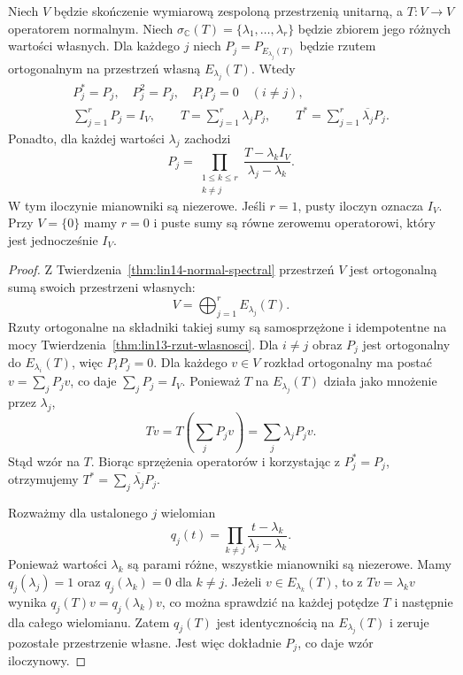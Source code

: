 \begin{twierdzenie}
\label{thm:lin14-spectral-projections}
Niech \(V\) będzie skończenie
wymiarową zespoloną przestrzenią
unitarną, a \(T\colon V\to V\)
operatorem normalnym.
Niech
\(\sigma_{\mathbb C}(T)=
 \{\lambda_1,\ldots,\lambda_r\}\)
będzie zbiorem jego różnych wartości własnych.
Dla każdego \(j\) niech
\(P_j=P_{E_{\lambda_j}(T)}\)
będzie rzutem ortogonalnym na
przestrzeń własną \(E_{\lambda_j}(T)\).
Wtedy
\[
 \begin{gathered}
 P_j^*=P_j,\quad P_j^2=P_j,\quad
 P_iP_j=0\quad(i\ne j),\\
 \sum_{j=1}^{r}P_j=I_V,\qquad
 T=\sum_{j=1}^{r}\lambda_jP_j,\qquad
 T^*=\sum_{j=1}^{r}
            \overline{\lambda_j}P_j.
 \end{gathered}
\]
Ponadto, dla każdej wartości
\(\lambda_j\) zachodzi
\[
 P_j=
 \prod_{\substack{1\le k\le r\\ k\ne j}}
 \frac{T-\lambda_k I_V}
      {\lambda_j-\lambda_k}.
\]
W tym iloczynie mianowniki
są niezerowe. Jeśli \(r=1\),
pusty iloczyn oznacza \(I_V\).
Przy \(V=\{0\}\) mamy \(r=0\)
i puste sumy są równe
zerowemu operatorowi, który
jest jednocześnie \(I_V\).
\end{twierdzenie}
\begin{proof}
Z
Twierdzenia~\ref{thm:lin14-normal-spectral}
przestrzeń \(V\) jest ortogonalną
sumą swoich przestrzeni własnych:
\[
 V=\bigoplus_{j=1}^{r}E_{\lambda_j}(T).
\]
Rzuty ortogonalne na składniki
takiej sumy są samosprzężone
i idempotentne na mocy
Twierdzenia~\ref{thm:lin13-rzut-wlasnosci}.
Dla \(i\ne j\) obraz \(P_j\)
jest ortogonalny do \(E_{\lambda_i}(T)\),
więc \(P_iP_j=0\).
Dla każdego \(v\in V\)
rozkład ortogonalny ma postać
\(v=\sum_jP_jv\), co daje
\(\sum_jP_j=I_V\).
Ponieważ \(T\) na \(E_{\lambda_j}(T)\)
działa jako mnożenie przez \(\lambda_j\),
\[
 Tv=T\!\left(\sum_jP_jv\right)
   =\sum_j\lambda_jP_jv.
\]
Stąd wzór na \(T\).
Biorąc sprzężenia operatorów
i korzystając z \(P_j^*=P_j\),
otrzymujemy
\(T^*=\sum_j\overline{\lambda_j}P_j\).

Rozważmy dla ustalonego \(j\)
wielomian
\[
 q_j(t)=\prod_{k\ne j}
 \frac{t-\lambda_k}{\lambda_j-\lambda_k}.
\]
Ponieważ wartości \(\lambda_k\)
są parami różne, wszystkie
mianowniki są niezerowe.
Mamy
\(q_j(\lambda_j)=1\)
oraz
\(q_j(\lambda_k)=0\)
dla \(k\ne j\).
Jeżeli \(v\in E_{\lambda_k}(T)\),
to z \(Tv=\lambda_kv\) wynika
\(q_j(T)v=q_j(\lambda_k)v\),
co można sprawdzić na każdej
potędze \(T\) i następnie
dla całego wielomianu.
Zatem \(q_j(T)\)
jest identycznością na
\(E_{\lambda_j}(T)\)
i zeruje pozostałe
przestrzenie własne.
Jest więc dokładnie \(P_j\),
co daje wzór iloczynowy.
\end{proof}

